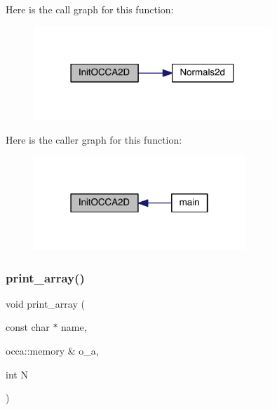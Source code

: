 Here is the call graph for this function\+:\nopagebreak
\begin{figure}[H]
\begin{center}
\leavevmode
\includegraphics[width=254pt]{a00584_a0dee5ebc8cec6627fc23083e47b4ca11_cgraph}
\end{center}
\end{figure}
Here is the caller graph for this function\+:\nopagebreak
\begin{figure}[H]
\begin{center}
\leavevmode
\includegraphics[width=226pt]{a00584_a0dee5ebc8cec6627fc23083e47b4ca11_icgraph}
\end{center}
\end{figure}
\mbox{\label{a00584_a799a7d00720c00822259c59c686fc672}} 
\subsubsection{\texorpdfstring{print\+\_\+array()}{print\_array()}}
{\footnotesize\ttfamily void print\+\_\+array (\begin{DoxyParamCaption}\item[{const char $\ast$}]{name,  }\item[{occa\+::memory \&}]{o\+\_\+a,  }\item[{int}]{N }\end{DoxyParamCaption})}

\mbox{\label{a00584_a21a02761bc746f8e6205d02f662aee16}} 
